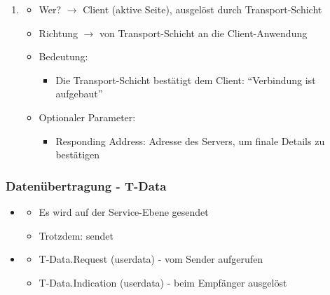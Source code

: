 \begin{enumerate}
\begin{itemize}
        \item Richtung $\rightarrow$ von Server-Anwendung an Transport-Schicht
        \item Bedeutung:
        \begin{itemize}
            \item Der Server sagt: \enquote{Ja, ich akzeptiere die Verbindung}
        \end{itemize}
        \item Parameter:
        \begin{itemize}
            \item \texttt{Responding Address:} Adresse des Servers (kann benutzt werden, um Verbindung zu bestätigen und zu identifizieren)
        \end{itemize}
    \end{itemize}
    \item {}
    \begin{itemize}
        \item Wer? $\rightarrow$ Client (aktive Seite), ausgelöst durch Transport-Schicht
        \item Richtung $\rightarrow$ von Transport-Schicht an die Client-Anwendung
        \item Bedeutung:
        \begin{itemize}
            \item Die Transport-Schicht bestätigt dem Client: \enquote{Verbindung ist aufgebaut}
        \end{itemize}
        \item Optionaler Parameter:
        \begin{itemize}
            \item Responding Address: Adresse des Servers, um finale Details zu bestätigen
        \end{itemize}
    \end{itemize}
\end{enumerate}
\subsubsection*{Datenübertragung - T-Data}
\begin{itemize}
    \item {}
    \begin{itemize}
        \item {} Es wird  auf der Service-Ebene gesendet
        \item Trotzdem:  sendet 
    \end{itemize}
    \item {}
    \begin{itemize}
        \item T-Data.Request (userdata) - vom Sender aufgerufen
        \item T-Data.Indication (userdata) - beim Empfänger ausgelöst
    \end{itemize}
\end{itemize}
\clearpage
